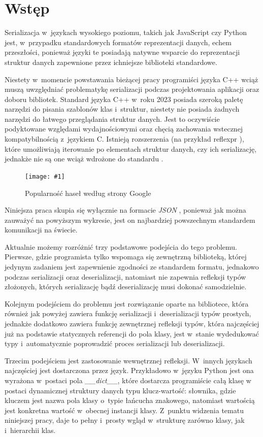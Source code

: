 \documentclass[12pt]{article}
\newcommand{\n}{\newline}
\newcommand{\putfig}[3]{
	\begin{figure}[H]
	\centering
	\texttt{[image: \#1]}
	\caption{#2}
	\label{#3}
	\medskip
\end{figure}
}
\newcommand{\nonpl}[1]{{\it #1}}
\newcommand{\code}[1]{{\it #1}}
\newcommand{\JSON}{\nonpl{JSON} }
\begin{document}
	{
		\section{Wstęp}

		Serializacja w~językach wysokiego poziomu, takich jak JavaScript czy Python jest, w~przypadku standardowych formatów
		reprezentacji danych, echem przeszłości, ponieważ języki te posiadają natywne wsparcie do reprezentacji struktur danych
		zapewnione przez ichniejsze biblioteki standardowe.\n

		Niestety w~momencie powstawania bieżącej pracy programiści języka C++ wciąż muszą uwzględniać problematykę
		serializacji podczas projektowania aplikacji oraz doboru bibliotek. Standard języka C++ w~roku 2023 posiada szeroką
		paletę narzędzi do pisania szablonów klas i~struktur, niestety nie posiada żadnych narzędzi do łatwego przeglądania
		struktur danych. Jest to oczywiście podyktowane względami wydajnościowymi oraz chęcią zachowania wstecznej
		kompatybilnością z~językiem C. Istnieją rozszerzenia (na przykład reflexpr \cite*{cpp_extension_reflexpr_iso}), które
		umożliwiają iterowanie po elementach struktur danych, czy ich serializację, jednakże nie są one wciąż wdrożone do
		standardu \cite*{cpp_extension_reflexpr_short}.\n

		\putfig{./charts/output_with_charts_as_images/json_vs_other_formats.png}{ Popularność haseł według strony Google \cite*{google_trends_json_api_vs_rest_of_the_world}}{json_vs_world}

		Niniejsza praca skupia się wyłącznie na formacie \JSON\cite*{json_iso}, ponieważ jak można zauważyć na powyższym wykresie, jest on
		najbardziej powszechnym standardem komunikacji na świecie.\n

		Aktualnie możemy rozróżnić trzy podstawowe podejścia do tego problemu. Pierwsze, gdzie programista tylko wspomaga się
		zewnętrzną biblioteką, której jedynym zadaniem jest zapewnienie zgodności ze standardem formatu, jednakowo podczas serializacji
		oraz deserializacji, natomiast nie zapewnia refleksji typów złożonych, których serializację bądź deserializację musi
		dokonać samodzielnie.\n

		Kolejnym podejściem do problemu jest rozwiązanie oparte na bibliotece, która również jak powyżej zawiera funkcję
		serializacji i~deserializacji typów prostych, jednakże dodatkowo zawiera funkcję zewnętrznej refleksji typów,
		która najczęściej już na podstawie statycznych referencji do pola klasy, jest w~stanie wydedukować typy i~automatycznie
		poprowadzić proces serializacji lub deserializacji.\n

		Trzecim podejściem jest zastosowanie wewnętrznej refleksji. W~innych językach najczęściej jest dostarczona przez język.
		Przykładowo w~języku Python jest ona wyrażona w~postaci pola \code{\_\_dict\_\_}, które dostarcza programiście całą klasę
		w postaci dynamicznej struktury danych typu klucz-wartość: słownika, gdzie kluczem jest nazwa pola klasy o~typie
		łańcucha znakowego, natomiast wartością jest konkretna wartość w~obecnej instancji klasy. Z~punktu widzenia tematu
		niniejszej pracy, daje to pełny i~prosty wgląd w~strukturę zarówno klasy, jak i~hierarchii klas.
	}
\end{document}
